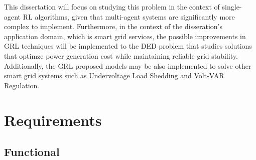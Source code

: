 This dissertation will focus on studying this problem in the context of single-agent \ac{RL} algorithms, given that multi-agent systems are significantly more complex to implement. Furthermore, in the context of the disseration's application domain, which is smart grid services, the possible improvements in \ac{GRL} techniques will be implemented to the \acf{DED} problem that studies solutions that optimze power generation cost while maintaining reliable grid stability. Additionally, the \ac{GRL} proposed models may be also implemented to solve other smart grid systems such as Undervoltage Load Shedding and Volt-VAR Regulation.

\section{Requirements}

\subsection{Functional}

